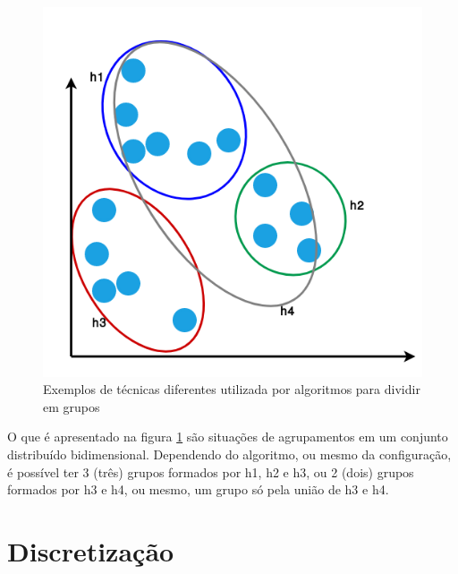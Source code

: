 \begin{figure}[h!]
    \centering
    \includegraphics[scale=0.4]{figs/amostra_dados_AprendNSuperv.png}
    
    
    \caption{Exemplos de técnicas diferentes utilizada por algoritmos para dividir em grupos} 
    \label{fig:planoCartesianoAprendNSup}     
\end{figure}


 

O que é apresentado na figura \ref{fig:planoCartesianoAprendNSup} são situações de agrupamentos em um conjunto distribuído bidimensional. Dependendo do algoritmo, ou mesmo da configuração, é possível ter 3 (três) grupos formados por h1, h2 e h3, ou 2 (dois) grupos formados por h3 e h4, ou mesmo, um grupo só pela união de h3 e h4. 

\section{Discretização}\label{cap:refTeor:sec:discret}

